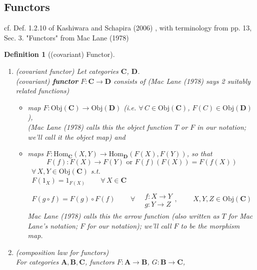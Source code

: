 \documentclass[10pt]{amsart}
\newtheorem{definition}{Definition}
\begin{document}
\begin{multicols*}{2}
\section{Functors}

cf. Def. 1.2.10 of Kashiwara and Schapira (2006) \cite{KaSch2006}, with terminology from pp. 13, Sec. 3. "Functors" from Mac Lane (1978) \cite{MacL1978}

\begin{definition}[(covariant) Functor]
\begin{enumerate}
	\item (covariant functor) Let categories $\mathbf{C}$, $\mathbf{D}$. \\
(covariant) \textbf{functor} $F: \mathbf{C} \to \mathbf{D}$ consists of (Mac Lane (1978) \cite{MacL1978} says 2 suitably related functions)
\begin{itemize}
	\item map $F: \text{Obj}(\mathbf{C}) \to \text{Obj}(\mathbf{D})$ (i.e. $\forall \, C \in \text{Obj}(\mathbf{C})$, $F(C) \in \text{Obj}(\mathbf{D})$), \\
	(Mac Lane (1978) \cite{MacL1978} calls this the \emph{object function} $T$ or $F$ in our notation; we'll call it the \emph{object map}) and 
	\item maps $F: \text{Hom}_{\mathbf{C}}(X,Y) \to \text{Hom}_{\mathbf{D}}(F(X), F(Y))$, so that 
		\[	
			F(f) : F(X) \to F(Y) \text{ or } F(f)(F(X)) = F(f(X)) 
		\] \, $\forall \, X,Y \in \text{Obj}(\mathbf{C})$ s.t.
	\begin{equation}
	\begin{gathered}
	F(1_X) = 1_{F(X)} \qquad \, \forall \, X \in \mathbf{C} \\
	F(g\circ f) = F(g) \circ F(f) \qquad \, \forall \, \begin{aligned} & \quad \\ 
	& f: X \to Y \\
	& g: Y \to Z \end{aligned}, \qquad \, X,Y,Z \in \text{Obj}(\mathbf{C})
	\end{gathered}
	\end{equation}
	Mac Lane (1978) \cite{MacL1978} calls this the \emph{arrow function} (also written as $T$ for Mac Lane's notation; $F$ for our notation); we'll call $F$ to be the \emph{morphism map}. 
\end{itemize}
\item (composition law for functors) \\
For categories $\mathbf{A} , \mathbf{B}, \mathbf{C}$, functors $F: \mathbf{A} \to \mathbf{B}$, $G: \mathbf{B} \to \mathbf{C}$, \\

\end{enumerate}
\end{definition}
\end{multicols*}
\end{document}
